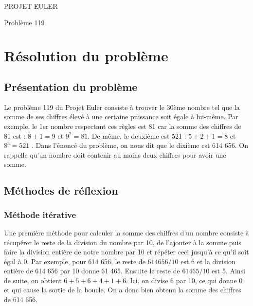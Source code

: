 \documentclass{article}
\begin{document}
\hfill
\hfill
\hfill
\begin{center}
  \large{PROJET EULER}

  Problème 119
\end{center}
\tableofcontents
\section {Résolution du problème}
\subsection {Présentation du problème}

Le problème 119 du Projet Euler consiste à trouver le 30ème nombre tel que la somme de ses chiffres élevé à une certaine puissance soit égale à lui-même. Par exemple, le 1er nombre respectant ces règles est 81 car la somme des chiffres de 81 est : $ 8 + 1 = 9 $ et $ 9^{2} = 81 $. De même, le deuxième est 521 : $ 5 + 2 + 1 = 8 $ et $ 8^{3} = 521 $	. Dans l'énoncé du problème, on nous dit que le dixième est 614 656. On rappelle qu'un nombre doit contenir au moins deux chiffres pour avoir une somme.

\subsection{Méthodes de réflexion}

\subsubsection{Méthode itérative}

Une première méthode pour calculer la somme des chiffres d'un nombre consiste à récupérer le reste de la division du nombre par 10, de l'ajouter à la somme puis faire la division entière de notre nombre par 10 et répéter ceci jusqu'à ce qu'il soit égal à 0. Par exemple, pour 614 656, le reste de $614656/10$ est 6 et la division entière de 614 656 par 10 donne 61 465. Ensuite le reste de $61465/10$ est 5. Ainsi de suite, on obtient $6 + 5 + 6 + 4 + 1 + 6$. Ici, on divise 6 par 10, ce qui donne 0 et qui cause la sortie de la boucle. On a donc bien obtenu la somme des chiffres de 614 656.
\newline
\end{document}
